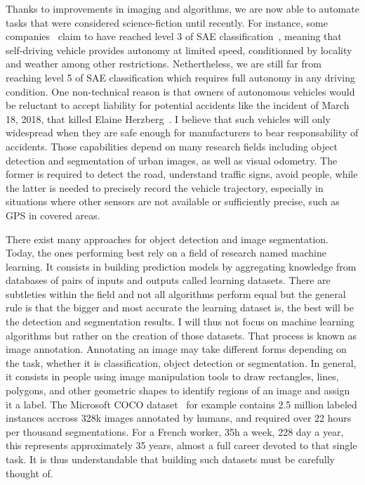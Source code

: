 Thanks to improvements in imaging and algorithms,
we are now able to automate tasks that were considered science-fiction until recently.
For instance, some companies~\cite{audia8} claim to have reached level 3
of SAE classification~\cite{sae-cars},
meaning that self-driving vehicle provides autonomy at limited speed,
conditionned by locality and weather among other restrictions.
Nethertheless, we are still far from reaching level 5 of SAE classification
which requires full autonomy in any driving condition.
One non-technical reason is that owners of autonomous vehicles would be reluctant
to accept liability for potential accidents like the incident
of March 18, 2018, that killed Elaine Herzberg~\cite{elaineherzberg}.
I believe that such vehicles will only widespread when they are
safe enough for manufacturers to bear responsability of accidents.
Those capabilities depend on many research fields
including object detection and segmentation of urban images,
as well as visual odometry.
The former is required to detect the road, understand traffic signs,
avoid people, while the latter is needed to precisely record
the vehicle trajectory, especially in situations where other sensors
are not available or sufficiently precise, such as GPS in covered areas.

There exist many approaches for object detection and image segmentation.
Today, the ones performing best rely on a field of research named machine learning.
It consists in building prediction models by aggregating knowledge
from databases of pairs of inputs and outputs called learning datasets.
There are subtleties within the field
and not all algorithms perform equal but the general rule is that
the bigger and most accurate the learning dataset is,
the best will be the detection and segmentation results.
I will thus not focus on machine learning algorithms
but rather on the creation of those datasets.
That process is known as image annotation.
Annotating an image may take different forms depending on the task,
whether it is classification, object detection or segmentation.
In general, it consists in people using image manipulation tools
to draw rectangles, lines, polygons, and other geometric shapes
to identify regions of an image and assign it a label.
The Microsoft COCO dataset~\cite{lin2014microsoft} for example
contains 2.5 million labeled instances accross 328k images annotated by humans,
and required over 22 hours per thousand segmentations.
For a French worker, 35h a week, 228 day a year, this represents approximately 35 years,
almost a full career devoted to that single task.
It is thus understandable that building such datasets must be carefully thought of.

